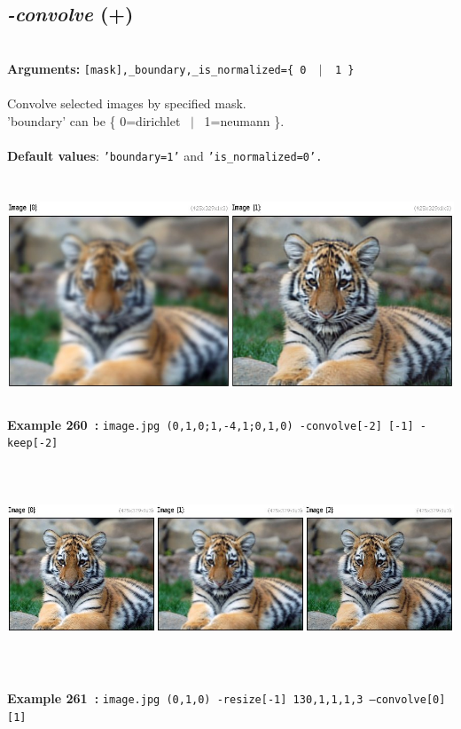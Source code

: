\documentclass[a4paper,11pt,twoside]{book}
\begin{document}
\subsection{\emph{-convolve} (+)}\vspace*{-0.5em}
~\\\textbf{Arguments: } 
{\small \texttt{[mask],\_boundary,\_is\_normalized=\{ 0 ~$|$~ 1 \}}}\\~\\
Convolve selected images by specified mask.
~\\'boundary' can be \{ 0=dirichlet ~$|$~ 1=neumann \}.
~\\~\\\textbf{Default values}: {\small \texttt{'boundary=1'} and \texttt{'is\_normalized=0'.}}
\begin{center}\includegraphics[keepaspectratio=true,height=7cm,width=\textwidth]{img/gmic_def260.jpg}\\
{\footnotesize \textbf{Example 260~:} \texttt{image.jpg (0,1,0;1,-4,1;0,1,0) -convolve[-2] [-1] -keep[-2]}}
\\\includegraphics[keepaspectratio=true,height=7cm,width=\textwidth]{img/gmic_def261.jpg}\\
{\footnotesize \textbf{Example 261~:} \texttt{image.jpg (0,1,0) -resize[-1] 130,1,1,1,3 --convolve[0] [1]}}
\end{center}
\end{document}
